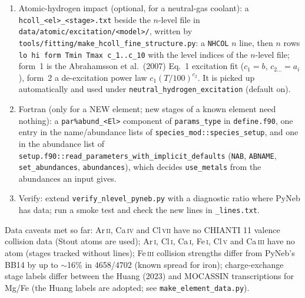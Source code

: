 \documentclass[english,a4paper]{my_memo}
\newcommand{\code}[1]{\texttt{#1}}
\begin{document}
\begin{enumerate}
  negative, reaches $E_{\rm inn}$ or does not join the fit.  A charge-exchange rate given
  as a table is \code{CXR 8} followed by
  \code{CXRTAB} $n\;T_1..T_n\;k_1..k_n$ ($n \le 1024$; K and cm$^3$\,s$^{-1}$,
  interpolated log--log, $T$ held at the table ends), as for the Barragan
  et al.\ (2006) N$^{2+}$ and O$^{2+}$ rows.  A transition resolved by the
  product term of the ion is \code{CXI 9} and \code{CXR 9} followed by
  \code{CXSTATE} $n_{\rm term}\;n_T\;g_{\rm react}\;\Delta{\rm IP}$,
  \code{CXSTATET} $T_1..T_{n_T}$ and one \code{CXSTATEK}
  $label\;l_{\rm lo}\;l_{\rm hi}\;g\;E\;k_1..k_{n_T}$ row for each term
  (its levels in \code{nlevel\_<el>\_<stage+1>.txt}, weight, energy [eV],
  forward rate into it): the forward rate is the sum, the reverse each
  channel's detailed balance weighted by the term's population from that
  $n$-level atom at the local $(T, n_e)$ (sulfur, Zhao et al.\ 2005).
\item Atomic-hydrogen impact (optional, for a neutral-gas coolant): a
  \code{hcoll\_<el>\_<stage>.txt} beside the $n$-level file in
  \code{data/atomic/excitation/<model>/},
  written by \code{tools/fitting/make\_hcoll\_fine\_structure.py}: a
  \code{NHCOL} $n$ line, then $n$ rows
  \code{lo hi form Tmin Tmax c\_1..c\_10} with the level indices of the
  $n$-level file; form~1 is the Abrahamsson et al.\ (2007) Eq.~1 excitation
  fit ($c_1 = b$, $c_{2\ldots} = a_i$), form~2 a de-excitation power law
  $c_1 (T/100)^{c_2}$.  It is picked up automatically and used under
  \code{neutral\_hydrogen\_excitation} (default on).
\item Fortran (only for a NEW element; new stages of a known element need
  nothing): a \code{par\%abund\_<El>} component of \code{params\_type} in
  \code{define.f90}, one entry in the name/abundance lists of
  \code{species\_mod::species\_setup}, and one in the abundance list of
  \code{setup.f90::read\_parameters\_with\_implicit\_defaults} (\code{NAB},
  \code{ABNAME}, \code{set\_abundances}, \code{abundances}), which decides
  \code{use\_metals} from the abundances an input gives.
\item Verify: extend \code{verify\_nlevel\_pyneb.py} with a diagnostic
  ratio where PyNeb has data; run a smoke test and check the new lines
  in \code{\_lines.txt}.
\end{enumerate}
Data caveats met so far: Ar\,\textsc{ii}, Ca\,\textsc{iv} and
Cl\,\textsc{vii} have no CHIANTI 11 valence collision data (Stout atoms are
used); Ar\,\textsc{i}, Cl\,\textsc{i}, Ca\,\textsc{i}, Fe\,\textsc{i},
Cl\,\textsc{v} and Ca\,\textsc{iii} have no atom (stages tracked without
lines); Fe\,\textsc{iii}
collision strengths differ from PyNeb's BB14 by up to $\sim$16\% in
4658/4702 (known spread for iron); charge-exchange stage labels differ
between the Huang (2023) and MOCASSIN transcriptions for Mg/Fe (the
Huang labels are adopted; see \code{make\_element\_data.py}).
\end{document}

